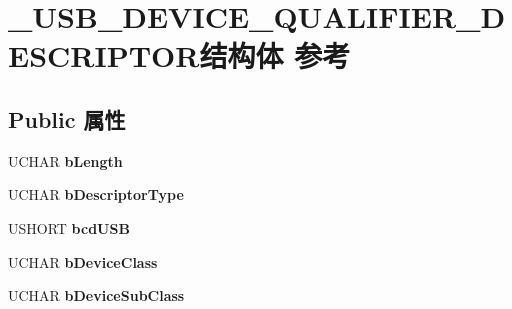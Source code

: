 \hypertarget{struct___u_s_b___d_e_v_i_c_e___q_u_a_l_i_f_i_e_r___d_e_s_c_r_i_p_t_o_r}{}\section{\+\_\+\+U\+S\+B\+\_\+\+D\+E\+V\+I\+C\+E\+\_\+\+Q\+U\+A\+L\+I\+F\+I\+E\+R\+\_\+\+D\+E\+S\+C\+R\+I\+P\+T\+O\+R结构体 参考}
\label{struct___u_s_b___d_e_v_i_c_e___q_u_a_l_i_f_i_e_r___d_e_s_c_r_i_p_t_o_r}
\subsection*{Public 属性}
\begin{DoxyCompactItemize}
\item 
\mbox{\label{struct___u_s_b___d_e_v_i_c_e___q_u_a_l_i_f_i_e_r___d_e_s_c_r_i_p_t_o_r_a5812dd48ca75f51085e262334af68aab}} 
U\+C\+H\+AR {\bfseries b\+Length}
\item 
\mbox{\label{struct___u_s_b___d_e_v_i_c_e___q_u_a_l_i_f_i_e_r___d_e_s_c_r_i_p_t_o_r_a8c475cca1f4b864ba74d65837cf0f5de}} 
U\+C\+H\+AR {\bfseries b\+Descriptor\+Type}
\item 
\mbox{\label{struct___u_s_b___d_e_v_i_c_e___q_u_a_l_i_f_i_e_r___d_e_s_c_r_i_p_t_o_r_a7fbef127a26726ca83d07405fe8a5d17}} 
U\+S\+H\+O\+RT {\bfseries bcd\+U\+SB}
\item 
\mbox{\label{struct___u_s_b___d_e_v_i_c_e___q_u_a_l_i_f_i_e_r___d_e_s_c_r_i_p_t_o_r_a614bdee7364991679b2d339d2c8dbe25}} 
U\+C\+H\+AR {\bfseries b\+Device\+Class}
\item 
\mbox{\label{struct___u_s_b___d_e_v_i_c_e___q_u_a_l_i_f_i_e_r___d_e_s_c_r_i_p_t_o_r_a9ea46fba4d3bcf0e0d72193a54ee9fc4}} 
U\+C\+H\+AR {\bfseries b\+Device\+Sub\+Class}
\item 

\end{DoxyCompactItemize}
